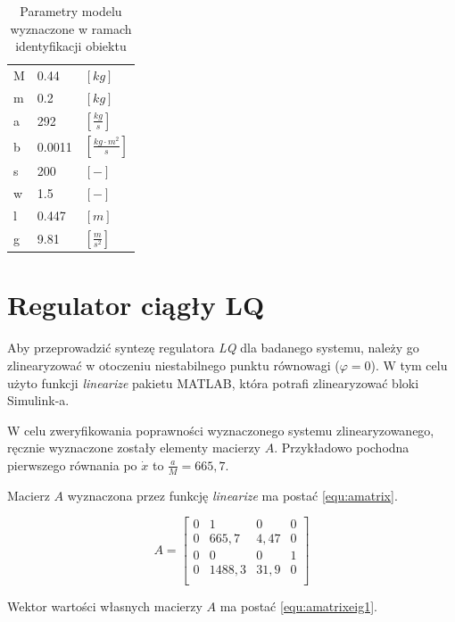 \documentclass[12pt]{article}
\begin{document}
\begin{table}[!htb]
    \centering
    \begin{tabular}{|l|l|l|}
        \hline
        M & 0.44 & $[kg]$ \\
        m & 0.2 & $[kg]$ \\
        a & 292 & $[\frac{kg}{s}]$ \\
        b & 0.0011 & $[\frac{kg\cdot m^2}{s}]$ \\
        s & 200 & $[-]$ \\
        w & 1.5 & $[-]$ \\
        l & 0.447 & $[m]$ \\
        g & 9.81 & $[\frac{m}{s^2}]$ \\[0.01cm]
        \hline
    \end{tabular}
    \caption{Parametry modelu wyznaczone w ramach identyfikacji obiektu}
    \label{tab:parametry}
\end{table}

\newpage

\section{Regulator ciągły LQ}

Aby przeprowadzić syntezę regulatora \textit{LQ} dla badanego systemu, należy go
zlinearyzować w otoczeniu niestabilnego punktu równowagi ($\varphi = 0$). W tym
celu użyto funkcji \textit{linearize} pakietu \textrm{MATLAB}, która potrafi
zlinearyzować bloki \textrm{Simulink}-a.

W celu zweryfikowania poprawności wyznaczonego systemu zlinearyzowanego,
ręcznie wyznaczone zostały elementy macierzy $A$. Przykładowo pochodna
pierwszego równania po $\dot{x}$ to $\frac{a}{M} = 665,7$.

Macierz $A$ wyznaczona przez funkcję \textit{linearize} ma postać
\eqref{equ:amatrix}.

\begin{equation}
    A = 
    \begin{bmatrix}
        0 & 1 & 0 & 0\\
        0 & 665,7 & 4,47 & 0\\
        0 & 0 & 0 & 1\\
        0 & 1488,3 & 31,9 & 0\\
    \end{bmatrix}
    \label{equ:amatrix}
\end{equation}

Wektor wartości własnych macierzy $A$ ma postać \eqref{equ:amatrixeig1}.
\end{document}
